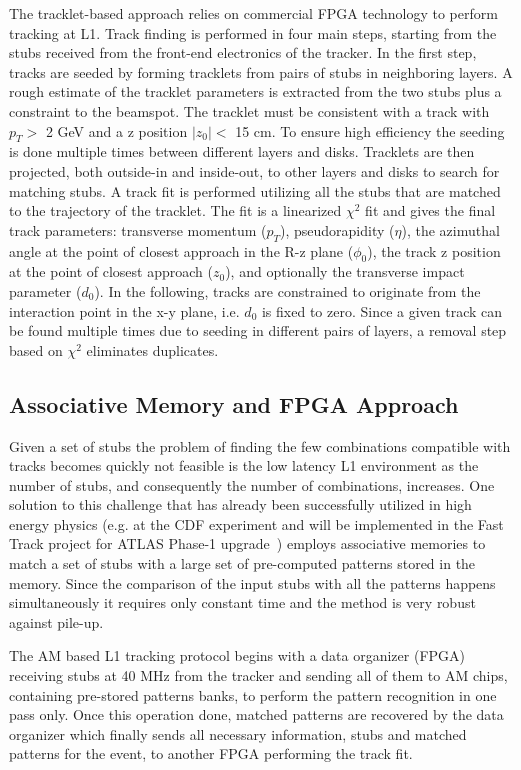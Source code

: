 \documentclass{PoS}
\begin{document}
The tracklet-based approach relies on commercial FPGA technology to perform tracking at L1. Track finding is performed in four main steps, starting from the stubs received from the front-end electronics of the tracker. In the first step, tracks are seeded by forming tracklets from pairs of stubs in neighboring layers. A rough estimate of the tracklet parameters is extracted from the two stubs plus a constraint to the beamspot. The tracklet must be consistent with a track with $p_T >$ 2 GeV and a z position $|z_0| <$ 15 cm. To ensure high efficiency the seeding is done multiple times between different layers and disks. Tracklets are then projected, both outside-in and inside-out, to other layers and disks to search for matching stubs. A track fit is performed utilizing all the stubs that are matched to the trajectory of the tracklet. The fit is a linearized $\chi^2$ fit and gives the final track parameters: transverse momentum ($p_T$), pseudorapidity ($\eta$), the azimuthal angle at the point of closest approach in the R-z plane ($\phi_0$), the track z position at the point of closest approach ($z_0$), and optionally the transverse impact parameter ($d_0$). In the following, tracks are constrained to originate from the interaction point in the x-y plane, i.e. $d_0$ is fixed to zero. Since a given track can be found multiple times due to seeding in different pairs of layers, a removal step based on $\chi^2$ eliminates duplicates.

\subsection{Associative Memory and FPGA Approach}

Given a set of stubs the problem of finding the few combinations compatible with tracks becomes quickly not feasible is the low latency L1 environment as the number of stubs, and consequently the number of combinations, increases. One solution to this challenge that has already been successfully utilized in high energy physics (e.g. at the CDF experiment and will be implemented in the Fast Track project for ATLAS Phase-1 upgrade~\cite{ATLAS_AM}) employs associative memories to match a set of stubs with a large set of pre-computed patterns stored in the memory. Since the comparison of the input stubs with all the patterns happens simultaneously it requires only constant time and the method is very robust against pile-up.

The AM based L1 tracking protocol begins with a data organizer (FPGA) receiving stubs at 40 MHz from the tracker and sending all of them to AM chips, containing pre-stored patterns banks, to perform the pattern recognition in one pass only. Once this operation done, matched patterns are recovered by the data organizer which finally sends all necessary information, stubs and matched patterns for the event, to another FPGA performing the track fit.
\end{document}
